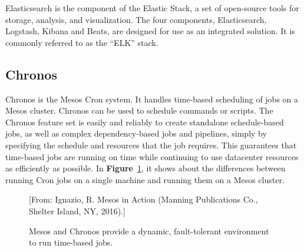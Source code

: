 \documentclass[12pt,oneside,openright,a4paper]{cpe-english-project}
\begin{document}
Elasticsearch is the component of the Elastic Stack, a set of open-source tools for storage, analysis, and visualization. The four components, Elasticsearch, Logstash, Kibana and Beats, are designed for use as an integrated solution. It is commonly referred to as the “ELK” stack.\cite{elasticsearch}

\subsection{Chronos}
\hspace{10mm}Chronos is the Mesos Cron system. It handles time-based scheduling of jobs on a Mesos cluster. Chronos can be used to schedule commands or scripts. The Chronos feature set is easily and reliably to create standalone schedule-based jobs, as well as complex dependency-based jobs and pipelines, simply by specifying the schedule and resources that the job requires. This guarantees that time-based jobs are running on time while continuing to use datacenter resources as efficiently as possible. In \textbf{Figure}~\ref{fig:chronos}, it shows about the differences between running Cron jobs on a single machine and running them on a Mesos cluster.\cite{mesosInAction}

\begin{figure}[!h]\centering
  \setlength{\fboxrule}{0mm} %
  \setlength{\fboxsep}{0cm}
  \caption{Mesos and Chronos provide a dynamic, fault-tolerant environment to run time-based jobs.}\label{fig:chronos}
  [From: Ignazio, R. Mesos in Action (Manning Publications Co., Shelter Island, NY, 2016).]
\end{figure}
\end{document}
